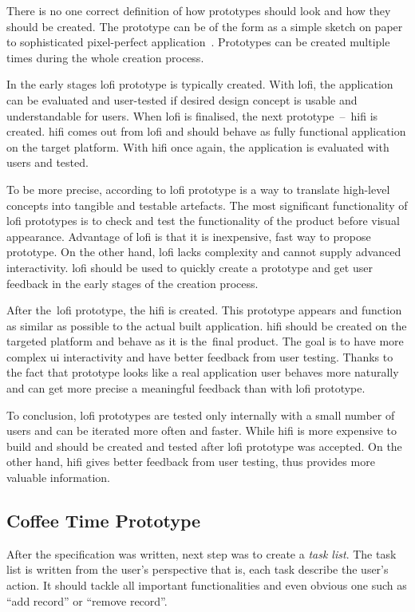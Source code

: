 There is no one correct definition of how prototypes should look and how they should be created. The prototype can be of the form as a simple sketch on paper to sophisticated pixel-perfect application~\cite{adobe-prototype}. Prototypes can be created multiple times during the whole creation process. 

In the early stages \gls{lofi} prototype is typically created. With \gls{lofi}, the application can be evaluated and user-tested if desired design concept is usable and understandable for users. When \gls{lofi} is finalised, the next prototype~--~\gls{hifi} is created. \gls{hifi} comes out from \gls{lofi} and should behave as fully functional application on the target platform. With \gls{hifi} once again, the application is evaluated with users and tested. 

To be more precise, according to \cite{adobe-prototype} \gls{lofi} prototype is a way to translate high-level concepts into tangible and testable artefacts. The most significant  functionality  of \gls{lofi} prototypes is to check and test the functionality of the product before visual appearance. Advantage of \gls{lofi} is that it is inexpensive, fast way to propose prototype. On the other hand, \gls{lofi} lacks complexity and cannot supply advanced interactivity. \gls{lofi} should be used to quickly create a prototype and get user feedback in the early stages of the creation process. 

After the~\gls{lofi} prototype, the \gls{hifi} is created. This prototype appears and function as similar as possible to the actual built application. \gls{hifi} should be created on the targeted platform and behave as it is the~final product. The goal is to have more complex \gls{ui} interactivity and have better feedback from user testing. Thanks to the fact that prototype looks like a real application user behaves more naturally and can get more precise a meaningful feedback than with \gls{lofi} prototype. 

To conclusion, \gls{lofi} prototypes are tested only internally with a small number of users and can be iterated more often and faster. While \gls{hifi} is more expensive to build and should be created and tested after \gls{lofi} prototype was accepted. On the other hand, \gls{hifi} gives better feedback from user testing, thus provides more valuable information.

\subsection{Coffee Time Prototype}
After the specification was written, next step was to create a \textit{task list}. The task list is written from the user's perspective that is, each task describe the user's action. It should tackle all important functionalities and even obvious one such as ``add record'' or ``remove record''.

